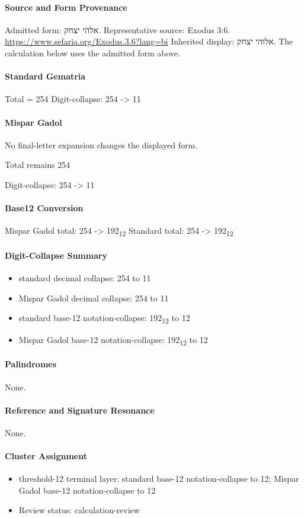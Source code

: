 \paragraph{Source and Form Provenance}
Admitted form: אלהי יצחק.
Representative source: Exodus 3:6.
\url{https://www.sefaria.org/Exodus.3.6?lang=bi}
Inherited display: אלוהי יצחק. The calculation below uses the admitted form above.
\paragraph{Standard Gematria}
Total = 254
Digit-collapse: 254 -> 11
\paragraph{Mispar Gadol}
No final-letter expansion changes the displayed form.

Total remains 254

Digit-collapse: 254 -> 11
\paragraph{Base12 Conversion}
Mispar Gadol total: 254 -> 192\textsubscript{12}
Standard total: 254 -> 192\textsubscript{12}
\paragraph{Digit-Collapse Summary}
\begin{itemize}
\item standard decimal collapse: 254 to 11
\item Mispar Gadol decimal collapse: 254 to 11
\item standard base-12 notation-collapse: 192\textsubscript{12} to 12
\item Mispar Gadol base-12 notation-collapse: 192\textsubscript{12} to 12
\end{itemize}
\paragraph{Palindromes}
None.
\paragraph{Reference and Signature Resonance}
None.
\paragraph{Cluster Assignment}
\begin{itemize}
\item threshold-12 terminal layer: standard base-12 notation-collapse to 12; Mispar Gadol base-12 notation-collapse to 12
\item Review status: calculation-review
\end{itemize}
